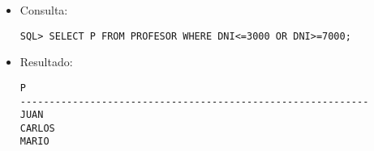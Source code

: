 \documentclass[11pt]{report}
\begin{document}
\begin{itemize}
  \item Consulta:
  \begin{verbatim}
SQL> SELECT P FROM PROFESOR WHERE DNI<=3000 OR DNI>=7000;
  \end{verbatim}
  \item{Resultado:}
  \begin{verbatim}
P                                                                                                                                                                                                                                                                                                                                                                                                                                                                                                                   
------------------------------------------------------------                                                                                                                                                                                                                                                                                                                                                                                                                                                        
JUAN                                                                                                                                                                                                                                                                                                                                                                                                                                                                                                                
CARLOS                                                                                                                                                                                                                                                                                                                                                                                                                                                                                                              
MARIO                                                                                                                                                                                                                                                                                                                                                                                                                                                                                                               

\end{verbatim}
\end{itemize}
\end{document}
